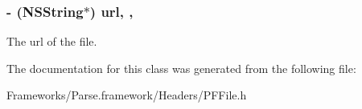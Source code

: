 \subsubsection[{url}]{\setlength{\rightskip}{0pt plus 5cm}-\/ (N\+S\+String$\ast$) url\hspace{0.3cm}{\ttfamily [read]}, {\ttfamily [nonatomic]}, {\ttfamily [copy]}}\label{interface_p_f_file_ada906196949937fe800cc0cab2bc10e4}
The url of the file. 

The documentation for this class was generated from the following file\+:\begin{DoxyCompactItemize}
\item 
Frameworks/\+Parse.\+framework/\+Headers/P\+F\+File.\+h\end{DoxyCompactItemize}
